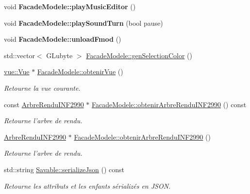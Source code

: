 \begin{DoxyCompactItemize}
\item 
\hypertarget{group__inf2990_ga91b21156f39935cd430bc95573af141e}{void {\bfseries Facade\-Modele\-::play\-Music\-Editor} ()}\label{group__inf2990_ga91b21156f39935cd430bc95573af141e}

\item 
\hypertarget{group__inf2990_gad683ea4f3c133637035b888be80548fe}{void {\bfseries Facade\-Modele\-::play\-Sound\-Turn} (bool pause)}\label{group__inf2990_gad683ea4f3c133637035b888be80548fe}

\item 
\hypertarget{group__inf2990_ga1df1b267321f9b5bc811f650509a83e2}{void {\bfseries Facade\-Modele\-::unload\-Fmod} ()}\label{group__inf2990_ga1df1b267321f9b5bc811f650509a83e2}

\item 
std\-::vector$<$ G\-Lubyte $>$ \hyperlink{group__inf2990_ga5b063c3392884c46da2a8e5688bd61d0}{Facade\-Modele\-::gen\-Selection\-Color} ()
\item 
\hyperlink{classvue_1_1_vue}{vue\-::\-Vue} $\ast$ \hyperlink{group__inf2990_gaa56cf96b7e381e0f14e2c9a55be913bf}{Facade\-Modele\-::obtenir\-Vue} ()
\begin{DoxyCompactList}\small\item\em Retourne la vue courante. \end{DoxyCompactList}\item 
const \hyperlink{class_arbre_rendu_i_n_f2990}{Arbre\-Rendu\-I\-N\-F2990} $\ast$ \hyperlink{group__inf2990_gaf578161d03b2157cdaa3182900ff61cc}{Facade\-Modele\-::obtenir\-Arbre\-Rendu\-I\-N\-F2990} () const 
\begin{DoxyCompactList}\small\item\em Retourne l'arbre de rendu. \end{DoxyCompactList}\item 
\hyperlink{class_arbre_rendu_i_n_f2990}{Arbre\-Rendu\-I\-N\-F2990} $\ast$ \hyperlink{group__inf2990_ga12d5594db6a9507b24c7e1ffcd6751af}{Facade\-Modele\-::obtenir\-Arbre\-Rendu\-I\-N\-F2990} ()
\begin{DoxyCompactList}\small\item\em Retourne l'arbre de rendu. \end{DoxyCompactList}\item 
std\-::string \hyperlink{group__inf2990_ga454a7c175c0864c3656283bafcb8413e}{Savable\-::serialize\-Json} () const 
\begin{DoxyCompactList}\small\item\em Retourne les attributs et les enfants sérializés en J\-S\-O\-N. \end{DoxyCompactList}\item 

\end{DoxyCompactItemize}
